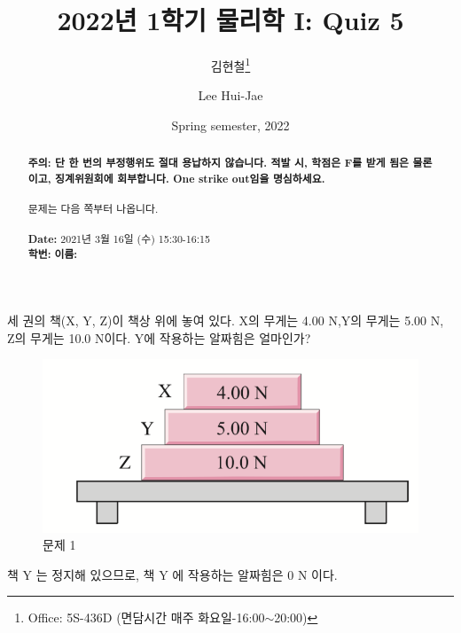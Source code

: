 \documentclass[floatfix,nofootinbib,superscriptaddress,fleqn,preprint]{revtex4}
\begin{document}
\title{\Large 2022년 1학기 물리학 I: Quiz 5}
\author{김현철\footnote{Office: 5S-436D (면담시간 매주
    화요일-16:00$\sim$20:00)}} 
\author{Lee Hui-Jae} 
\date{Spring semester, 2022}


\vspace{1.cm}
\begin{abstract}
\noindent \textbf{ {\color{red}주의}: \color{blue} 단 한 번의 부정행위도 절대
  용납하지 않습니다. 적발 시, 학점은 F를 받게 됨은 물론이고,
  징계위원회에 회부합니다. One strike out임을 명심하세요.}\\
\\
문제는 다음 쪽부터 나옵니다.  \\ \\
{\bf Date:} 2021년 3월 16일 (수) 15:30-16:15 
\\
{\bf 학번:} \hspace{4cm}
{\bf 이름:} 

\end{abstract}
\maketitle

세 권의 책(X, Y, Z)이 책상 위에 놓여 있다. X의
무게는 4.00 N,Y의 무게는 5.00 N, Z의 무게는 10.0 N이다. Y에 작용하는
알짜힘은 얼마인가? 
\begin{figure}[ht]
  \centering
\includegraphics[scale=0.6]{Qfig5-1.pdf}  
  \caption{문제 1}
  \label{fig:1}
\end{figure}

책 Y 는 정지해 있으므로, 책 Y 에 작용하는 알짜힘은 0 N 이다.

\vspace{2cm}
\end{document}
